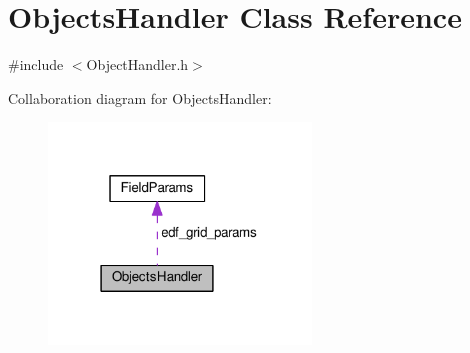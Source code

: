 \hypertarget{class_objects_handler}{}\section{Objects\+Handler Class Reference}
\label{class_objects_handler}


{\ttfamily \#include $<$Object\+Handler.\+h$>$}



Collaboration diagram for Objects\+Handler\+:
\nopagebreak
\begin{figure}[H]
\begin{center}
\leavevmode
\includegraphics[width=198pt]{class_objects_handler__coll__graph}
\end{center}
\end{figure}
